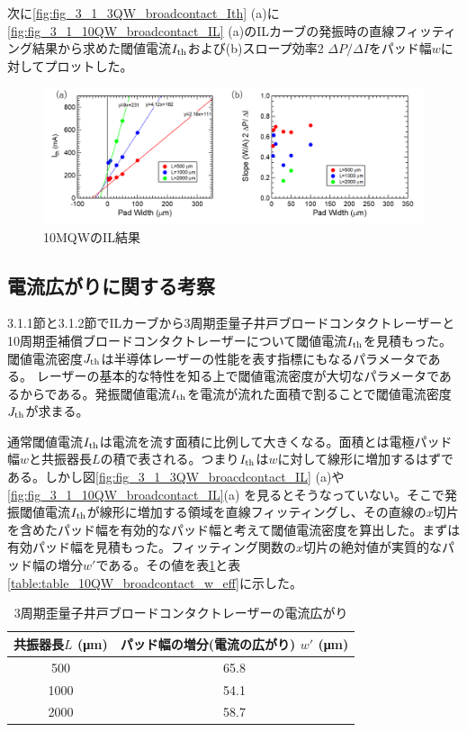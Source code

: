 次に\ref{fig:fig_3_1_3QW_broadcontact_Ith} (a)に\ref{fig:fig_3_1_10QW_broadcontact_IL} (a)のILカーブの発振時の直線フィッティング結果から求めた閾値電流$I_{\rm{th}}$および(b)スロープ効率2 $\Delta P/\Delta I$をパッド幅$w$に対してプロットした。
\begin{figure}[h]
	\centering
	\includegraphics[width=15cm]{figure/fig_3_1_10QW_broadcontact_Ith.png}
		\caption{10MQWのIL結果}
		\label{fig:fig_3_1_10QW_broadcontact_Ith}
\end{figure}

\subsection{電流広がりに関する考察}%
3.1.1節と3.1.2節でILカーブから3周期歪量子井戸ブロードコンタクトレーザーと10周期歪補償ブロードコンタクトレーザーについて閾値電流$I_{\rm{th}}$を見積もった。閾値電流密度$J_{\rm{th}}$は半導体レーザーの性能を表す指標にもなるパラメータである。
レーザーの基本的な特性を知る上で閾値電流密度が大切なパラメータであるからである。発振閾値電流$I_{\rm{th}}$を電流が流れた面積で割ることで閾値電流密度$J_{\rm{th}}$が求まる。

通常閾値電流$I_{\rm{th}}$は電流を流す面積に比例して大きくなる。面積とは電極パッド幅$w$と共振器長$L$の積で表される。つまり$I_{\rm{th}}$は$w$に対して線形に増加するはずである。しかし図\ref{fig:fig_3_1_3QW_broacdcontact_IL} (a)や\ref{fig:fig_3_1_10QW_broadcontact_IL}(a) を見るとそうなっていない。そこで発振閾値電流$I_{\rm{th}}$が線形に増加する領域を直線フィッティングし、その直線の$x$切片を含めたパッド幅を有効的なパッド幅と考えて閾値電流密度を算出した。まずは有効パッド幅を見積もった。フィッティング関数の$x$切片の絶対値が実質的なパッド幅の増分$w'$である。その値を表\ref{table:table_3QW_broadcontact_w_eff}と表\ref{table:table_10QW_broadcontact_w_eff}に示した。
\begin{table}[h]
  \caption{3周期歪量子井戸ブロードコンタクトレーザーの電流広がり}
  \label{table:table_3QW_broadcontact_w_eff}
  \centering
  \begin{tabular}{cc}
    \hline
    共振器長$L$ (\si{\micro\metre})  & パッド幅の増分(電流の広がり) $w'$ (\si{\micro\metre})   \\
    \hline \hline
     500 & 65.8  \\
    1000  & 54.1 \\
    2000  & 58.7 \\ 
    \hline
  \end{tabular}
\end{table}


